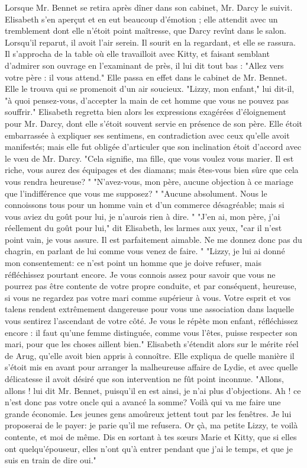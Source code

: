 Lorsque Mr. Bennet se retira après dîner dans son cabinet, Mr. Darcy le suivit. Elisabeth s'en aperçut et en eut beaucoup d'émotion ; elle attendit avec un tremblement dont elle n'étoit point maîtresse, que Darcy revînt dans le salon. Lorsqu'il reparut, il avoit l'air serein. Il sourit en la regardant, et elle se rassura. Il s'approcha de la table où elle travailloit avec Kitty, et faisant semblant d'admirer son ouvrage en l'examinant de près, il lui dit tout bas : "Allez vers votre père : il vous attend." Elle passa en effet dans le cabinet de Mr. Bennet. Elle le trouva qui se promenoit d'un air soucieux. "Lizzy, mon enfant," lui dit-il, "à quoi pensez-vous, d'accepter la main de cet homme que vous ne pouvez pas souffrir."
Elisabeth regretta bien alors les expressions exagérées d'éloignement pour Mr. Darcy,\setcounter{page}{268} dont elle s'étoit souvent servie en présence de son père. Elle étoit embarrassée à expliquer ses sentimens, en contradiction avec ceux qu'elle avoit manifestés; mais elle fut obligée d'articuler que son inclination étoit d'accord avec le vœu de Mr. Darcy.
"Cela signifie, ma fille, que vous voulez vous marier. Il est riche, vous aurez des équipages et des diamans; mais êtes-vous bien sûre que cela vous rendra heureuse? "
"N'avez-vous, mon père, aucune objection à ce mariage que l'indifférence que vous me supposez? "
"Aucune absolument. Nous le connoissons tous pour un homme vain et d'un commerce désagréable; mais si vous aviez du goût pour lui, je n'aurois rien à dire. "
"J'en ai, mon père, j'ai réellement du goût pour lui," dit Elisabeth, les larmes aux yeux, "car il n'est point vain, je vous assure. Il est parfaitement aimable. Ne me donnez donc pas du chagrin, en parlant de lui comme vous venez de faire. "
"Lizzy, je lui ai donné mon consentement: ce n'est point un homme que je doive refuser, mais réfléchissez pourtant encore. Je vous connois assez pour savoir que vous ne pourrez pas être contente de votre propre conduite, et par conséquent, heureuse,\setcounter{page}{269} si vous ne regardez pas votre mari comme supérieur à vous. Votre esprit et vos talens rendent extrêmement dangereuse pour vous une association dans laquelle vous sentirez l'ascendant de votre côté. Je vous le répète mon enfant, réfléchissez encore : il faut qu'une femme distinguée, comme vous l'êtes, puisse respecter son mari, pour que les choses aillent bien."
Elisabeth s'étendit alors sur le mérite réel de Arug, qu'elle avoit bien appris à connoître. Elle expliqua de quelle manière il s'étoit mis en avant pour arranger la malheureuse affaire de Lydie, et avec quelle délicatesse il avoit désiré que son intervention ne fût point inconnue.
"Allons, allons ! lui dit Mr. Bennet, puisqu'il en est ainsi, je n'ai plus d'objections. Ah ! ce n'est donc pas votre oncle qui a avancé la somme? Voilà qui va me faire une grande économie. Les jeunes gens amoûreux jettent tout par les fenêtres. Je lui proposerai de le payer: je parie qu'il me refusera. Or çà, ma petite Lizzy, te voilà contente, et moi de même. Dis en sortant à tes sœurs Marie et Kitty, que si elles ont quelqu'épouseur, elles n'ont qu'à entrer pendant que j'ai le temps, et que je suis en train de dire oui."